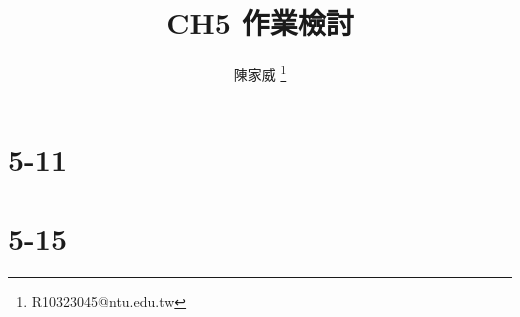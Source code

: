 \documentclass[mathserif]{beamer}
\title{CH5 作業檢討}
\author{陳家威 \thanks{R10323045@ntu.edu.tw}}
\begin{document}
    \begin{frame}    
        \maketitle
    \end{frame}

    \section{5-11}
    
    \section{5-15}
    
\end{document}
